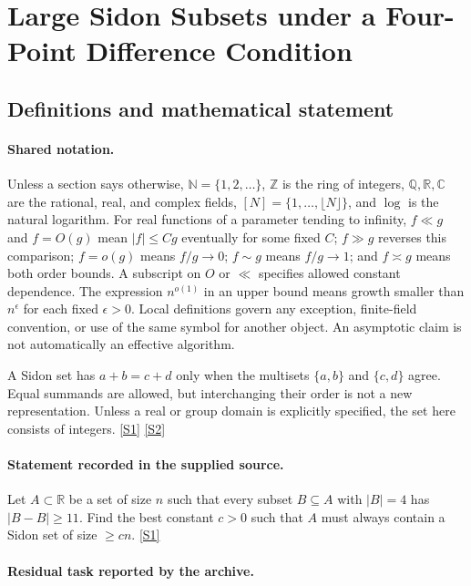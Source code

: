 \documentclass[11pt,a4paper]{article}
\newcommand{\N}{\mathbb{N}}
\newcommand{\Z}{\mathbb{Z}}
\newcommand{\Q}{\mathbb{Q}}
\newcommand{\R}{\mathbb{R}}
\newcommand{\C}{\mathbb{C}}
\newcommand{\sref}[2]{\hyperlink{source:#1:#2}{[S#2]}}
\begin{document}
\section{Large Sidon Subsets under a Four-Point Difference Condition}\label{statement}


\subsection{Definitions and mathematical statement}

\paragraph{Shared notation.}Unless a section says otherwise, $\N=\{1,2,\ldots\}$,
$\Z$ is the ring of integers, $\Q,\R,\C$ are the rational, real, and complex
fields, $[N]=\{1,\ldots,\lfloor N\rfloor\}$, and $\log$ is the natural
logarithm. For real functions of a parameter tending to infinity,
$f\ll g$ and $f=O(g)$ mean $|f|\leq Cg$ eventually for some fixed $C$;
$f\gg g$ reverses this comparison; $f=o(g)$ means $f/g\to0$;
$f\sim g$ means $f/g\to1$; and $f\asymp g$ means both order bounds.
A subscript on $O$ or $\ll$ specifies allowed constant dependence.
The expression $n^{o(1)}$ in an upper bound means growth smaller than
$n^\epsilon$ for each fixed $\epsilon>0$. Local definitions govern any
exception, finite-field convention, or use of the same symbol for another
object. An asymptotic claim is not automatically an effective algorithm.



A Sidon set has $a+b=c+d$ only when the multisets $\{a,b\}$ and $\{c,d\}$ agree. Equal summands are allowed, but interchanging their order is not a new representation. Unless a real or group domain is explicitly specified, the set here consists of integers. \sref{statement}{1} \sref{statement}{2}

\paragraph{Statement recorded in the supplied source.}
Let $A\subset \mathbb{R}$ be a set of size $n$ such that every subset $B\subseteq A$ with $\lvert B\rvert =4$ has $\lvert B-B\rvert\geq 11$. Find the best constant $c>0$ such that $A$ must always contain a Sidon set of size $\geq cn$. \sref{statement}{1}

\paragraph{Residual task reported by the archive.}
\end{document}
